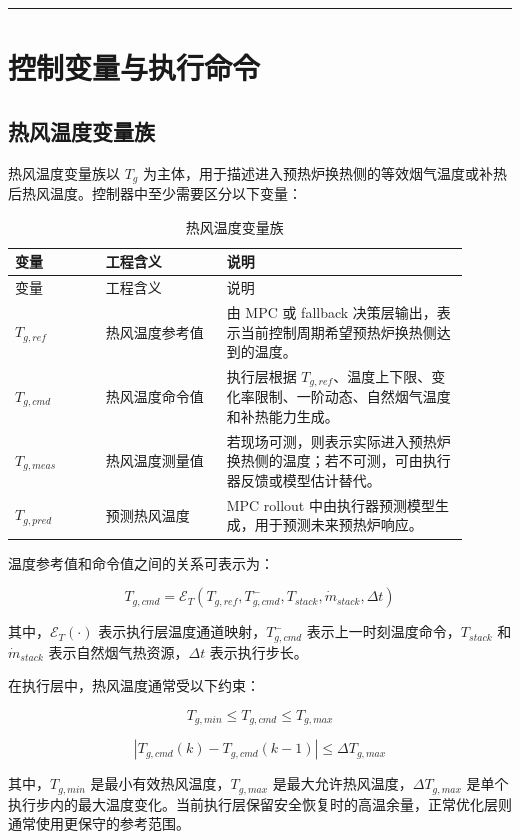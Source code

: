 \documentclass[UTF8,openany,zihao=-4,oneside]{ctexbook}
\newcommand{\manualdivider}{\par\vspace{0.6em}\noindent\textcolor{FGLine}{\rule{\linewidth}{0.7pt}}\vspace{0.6em}\par}
\begin{document}
\manualdivider

\section{控制变量与执行命令}\label{sec:control-and-command-vars}

\subsection{热风温度变量族}\label{subsec:Tg-family}

热风温度变量族以 \(T_g\) 为主体，用于描述进入预热炉换热侧的等效烟气温度或补热后热风温度。控制器中至少需要区分以下变量：

\begin{longtable}{@{}p{0.18\linewidth}p{0.24\linewidth}p{0.48\linewidth}@{}}
\caption{热风温度变量族}\label{tab:Tg-family}\\
\toprule
变量 & 工程含义 & 说明 \\
\midrule
\endfirsthead
\toprule
变量 & 工程含义 & 说明 \\
\midrule
\endhead
\(T_{g,ref}\) & 热风温度参考值 & 由 MPC 或 fallback 决策层输出，表示当前控制周期希望预热炉换热侧达到的温度。 \\
\(T_{g,cmd}\) & 热风温度命令值 & 执行层根据 \(T_{g,ref}\)、温度上下限、变化率限制、一阶动态、自然烟气温度和补热能力生成。 \\
\(T_{g,meas}\) & 热风温度测量值 & 若现场可测，则表示实际进入预热炉换热侧的温度；若不可测，可由执行器反馈或模型估计替代。 \\
\(T_{g,pred}\) & 预测热风温度 & MPC rollout 中由执行器预测模型生成，用于预测未来预热炉响应。 \\
\bottomrule
\end{longtable}

温度参考值和命令值之间的关系可表示为：

\[
T_{g,cmd}=\mathcal{E}_T\left(T_{g,ref},T_{g,cmd}^{-},T_{stack},\dot m_{stack},\Delta t\right)
\]

其中，\(\mathcal{E}_T(\cdot)\) 表示执行层温度通道映射，\(T_{g,cmd}^{-}\) 表示上一时刻温度命令，\(T_{stack}\) 和 \(\dot m_{stack}\) 表示自然烟气热资源，\(\Delta t\) 表示执行步长。

在执行层中，热风温度通常受以下约束：

\[
T_{g,min}\leq T_{g,cmd}\leq T_{g,max}
\]

\[
|T_{g,cmd}(k)-T_{g,cmd}(k-1)|\leq \Delta T_{g,max}
\]

其中，\(T_{g,min}\) 是最小有效热风温度，\(T_{g,max}\) 是最大允许热风温度，\(\Delta T_{g,max}\) 是单个执行步内的最大温度变化。当前执行层保留安全恢复时的高温余量，正常优化层则通常使用更保守的参考范围。
\end{document}
